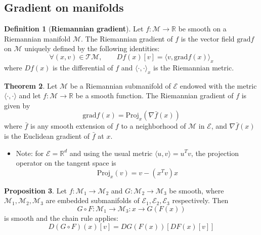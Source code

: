 \documentclass[12pt, openany]{report}
\newcommand{\R}{\mathbb{R}}
\newcommand{\M}{\mathcal{M}}
\theoremstyle{definition}
\newtheorem{thm}{Theorem}[chapter]
\newtheorem{definition}[thm]{Definition}
\newtheorem{proposition}[thm]{Proposition}
\begin{document}
\subsection{Gradient on manifolds}
\begin{definition}[\textbf{Riemannian gradient}]
	Let $f:\M\to \R$ be smooth on a Riemannian manifold $\M$. The Riemannian gradient of $f$ is the vector field $\text{grad} f$ on $\M$ uniquely defined by the following identities:
	\begin{equation}
		\forall (x,v)\in \mathcal{T}\M, \qquad Df(x)[v] = \langle v, \text{grad}f(x)\rangle_x 
	\end{equation}
	where $Df(x)$ is the differential of $f$ and $\langle \cdot, \cdot \rangle_x$ is the Riemannian metric. 
\end{definition}
\begin{thm}
	Let $\M$ be a Riemannian submanifold of $\mathcal{E}$ endowed with the metric $\langle\cdot, \cdot\rangle$ and let $f:\M\to \R$ be a smooth function. The Riemannian gradient of $f$ is given by 
	\begin{equation}
		\text{grad}f(x) = \text{Proj}_x(\nabla \bar f(x))
	\end{equation}
	where $\bar f$ is any smooth extension of $f$ to a neighborhood of $\M$ in $\mathcal{E}$, and $\nabla \bar f(x)$ is the Euclidean gradient of $\bar f$ at $x$.
\end{thm}
\begin{itemize}
	\item [$\to$] Note: for $\mathcal{E} =\R^d$ and using the usual metric $\langle u,v\rangle = u^T v$, the projection operator on the tangent space is 
	\begin{equation}
		\text{Proj}_x(v) = v - (x^T v)x
	\end{equation}
\end{itemize}
\begin{proposition}
	Let $f:\M_1\to \M_2$ and $G:\M_2\to \M_3$ be smooth, where $\M_1, \M_2, \M_3$ are embedded submanifolds of $\mathcal{E}_1, \mathcal{E}_2, \mathcal{E}_3$ respectively. Then
	\begin{equation}
		G\circ F : \M_1\to \M_3:x\to G(F(x))
	\end{equation}
	is smooth and the chain rule applies:
	\begin{equation}
		D(G\circ F)(x)[v] = DG(F(x))[DF(x)[v]]
	\end{equation}
\end{proposition}
\end{document}
